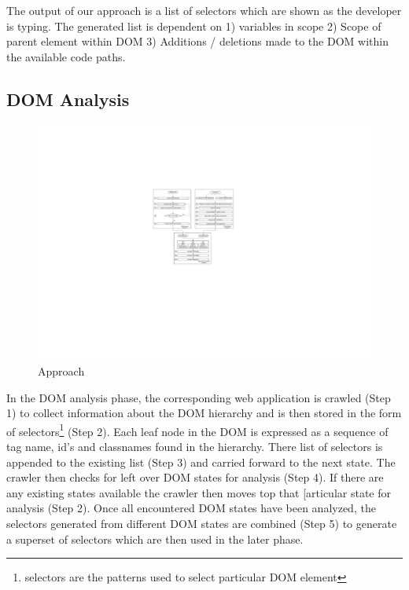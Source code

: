 	
		The output of our approach is a list of \css selectors which are shown as the developer is typing. The generated list is dependent on 1) \javascript variables in scope 2) Scope of parent element within DOM 3) Additions / deletions made to the DOM within the available code paths.
	
	\subsection{DOM Analysis}
	\label{Sec:DOM-Analysis}
		\begin{figure}
			\centering
			\includegraphics[width=175mm]{images/approach.pdf}
			\caption{Approach}
			\label{Fig:Approach}
		\end{figure}
		
		In the DOM analysis phase, the corresponding web application is crawled (Step 1) to collect information about the DOM hierarchy and is then stored in the form of \css selectors\footnote{\css selectors are the patterns used to select particular DOM element} (Step 2). Each leaf node in the DOM is expressed as a sequence of tag name, id's and classnames found in the hierarchy. There list of \css selectors is appended to the existing list (Step 3) and carried forward to the next state. The crawler then checks for left over DOM states for analysis (Step 4). If there are any existing states available the crawler then moves top that [articular state for analysis (Step 2).	 Once all encountered DOM states have been analyzed, the \css selectors generated from different DOM states are combined (Step 5) to generate a superset of \css selectors which are then used in the later phase.
		
